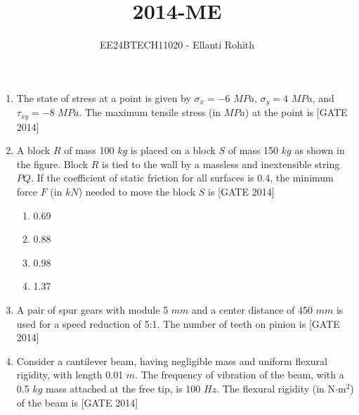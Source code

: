 \documentclass[journal,12pt,onecolumn]{IEEEtran}
\theoremstyle{remark}
\begin{document}

\vspace{3cm}

\title{2014-ME}
\author{EE24BTECH11020 -  Ellanti Rohith}
\maketitle

\renewcommand{\thefigure}{\theenumi}
\renewcommand{\thetable}{\theenumi}
\begin{enumerate}
    \item The state of stress at a point is given by $\sigma_x = -6$ $MPa$, $\sigma_y = 4$ $MPa$, and $\tau_{xy} = -8$ $MPa$. The maximum tensile stress (in $MPa$) at the point is \underline{\hspace{2cm}} \hfill{[GATE 2014]}
\\

    \item A block $R$ of mass 100 $kg$ is placed on a block $S$ of mass 150 $kg$ as shown in the figure. Block $R$ is tied to the wall by a massless and inextensible string $PQ$. If the coefficient of static friction for all surfaces is 0.4, the minimum force $F$ (in $kN$) needed to move the block $S$ is \hfill{[GATE 2014]}\\
    \begin{center}
    

    \end{center}

    \begin{multicols}{4}
    \begin{enumerate}
         \item 0.69
        \item 0.88
        \item 0.98
        \item 1.37
    
    \end{enumerate}
       
    \end{multicols}

    \item A pair of spur gears with module 5 $mm$ and a center distance of 450 $mm$ is used for a speed reduction of 5:1. The number of teeth on pinion is \underline{\hspace{2cm}} \hfill{[GATE 2014]}\\

   
    \item Consider a cantilever beam, having negligible mass and uniform flexural rigidity, with length 0.01 $m$. The frequency of vibration of the beam, with a 0.5 $kg$ mass attached at the free tip, is 100 $Hz$. The flexural rigidity (in N$\cdot$m$^2$) of the beam is \underline{\hspace{2cm}} \hfill{[GATE 2014]}\\


\end{enumerate}
\end{document}
